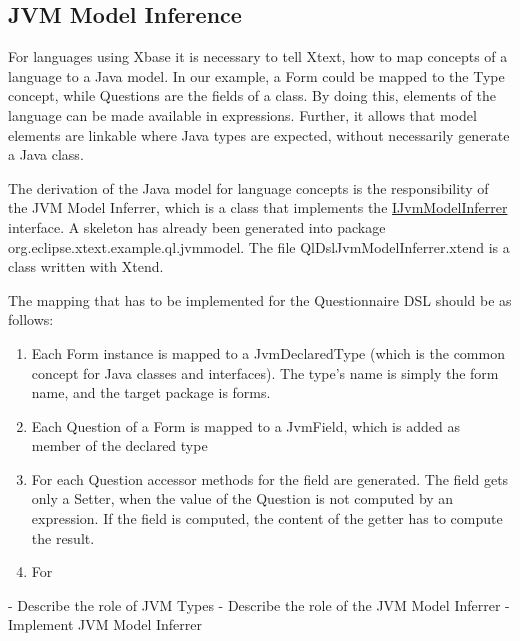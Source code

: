 \subsection{JVM Model Inference}

For languages using Xbase it is necessary to tell Xtext, how to map concepts of a language to a Java model. In our example,
a Form could be mapped to the Type concept, while Questions are the fields of a class. By doing this, elements of the language
can be made available in expressions. Further, it allows that model elements are linkable where Java types are expected, without
necessarily generate a Java class.

The derivation of the Java model for language concepts is the responsibility of the JVM Model Inferrer, which is a class that implements
the \href{http://download.eclipse.org/modeling/tmf/xtext/javadoc/2.3/org/eclipse/xtext/xbase/jvmmodel/IJvmModelInferrer.html}{IJvmModelInferrer} interface.
A skeleton has already been generated into package org.eclipse.xtext.example.ql.jvmmodel. The file QlDslJvmModelInferrer.xtend is a class
written with Xtend.


The mapping that has to be implemented for the Questionnaire DSL should be as follows:
\begin{enumerate}
  \item Each Form instance is mapped to a JvmDeclaredType (which is the common concept for Java classes and interfaces).
  The type's name is simply the form name, and the target package is forms.
  \item Each Question of a Form is mapped to a JvmField, which is added as member of the declared type
  \item For each Question accessor methods for the field are generated. The field gets only a Setter, when the value of the Question is
  not computed by an expression. If the field is computed, the content of the getter has to compute the result.
  \item For
\end{enumerate}

- Describe the role of JVM Types
- Describe the role of the JVM Model Inferrer
- Implement JVM Model Inferrer
